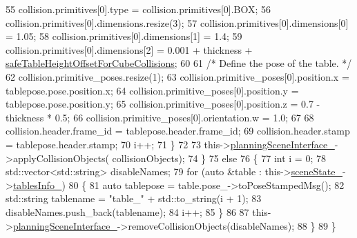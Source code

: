 \begin{DoxyCode}
55                     collision.primitives[0].type = collision.primitives[0].BOX;
56                     collision.primitives[0].dimensions.resize(3);
57                     collision.primitives[0].dimensions[0] = 1.05;
58                     collision.primitives[0].dimensions[1] = 1.4;
59                     collision.primitives[0].dimensions[2] = 0.001 + thickness + 
      \hyperlink{classsm__moveit__wine__serve_1_1cl__move__group__interface_1_1CpConstraintTableWorkspaces_a5233fcac3ab6ce00f9e1c6e950462e58}{safeTableHeightOffsetForCubeCollisions};
60 
61                     \textcolor{comment}{/* Define the pose of the table. */}
62                     collision.primitive\_poses.resize(1);
63                     collision.primitive\_poses[0].position.x = tablepose.pose.position.x;
64                     collision.primitive\_poses[0].position.y = tablepose.pose.position.y;
65                     collision.primitive\_poses[0].position.z = 0.7 - thickness * 0.5;
66                     collision.primitive\_poses[0].orientation.w = 1.0;
67 
68                     collision.header.frame\_id = tablepose.header.frame\_id;
69                     collision.header.stamp = tablepose.header.stamp;
70                     i++;
71                 \}
72 
73                 this->\hyperlink{classsm__moveit__wine__serve_1_1cl__move__group__interface_1_1CpConstraintTableWorkspaces_a1dd378cd9d4577e058e8d1e02550ccc7}{planningSceneInterface\_}->applyCollisionObjects(
      collisionObjects);
74             \}
75             \textcolor{keywordflow}{else}
76             \{
77                 \textcolor{keywordtype}{int} i = 0;
78                 std::vector<std::string> disableNames;
79                 \textcolor{keywordflow}{for} (\textcolor{keyword}{auto} &table : this->\hyperlink{classsm__moveit__wine__serve_1_1cl__move__group__interface_1_1CpConstraintTableWorkspaces_aab7d48a69283768e66236eaf39c52554}{sceneState\_}->\hyperlink{classsm__moveit__wine__serve_1_1cl__perception__system_1_1CpSceneState_aa6aea93bb143d2def50c97ec6b55e4cf}{tablesInfo\_})
80                 \{
81                     \textcolor{keyword}{auto} tablepose = table.pose\_->toPoseStampedMsg();
82                     std::string tablename = \textcolor{stringliteral}{"table\_"} + std::to\_string(i + 1);
83                     disableNames.push\_back(tablename);
84                     i++;
85                 \}
86 
87                 this->\hyperlink{classsm__moveit__wine__serve_1_1cl__move__group__interface_1_1CpConstraintTableWorkspaces_a1dd378cd9d4577e058e8d1e02550ccc7}{planningSceneInterface\_}->removeCollisionObjects(disableNames);
88             \}
89         \}
\end{DoxyCode}
